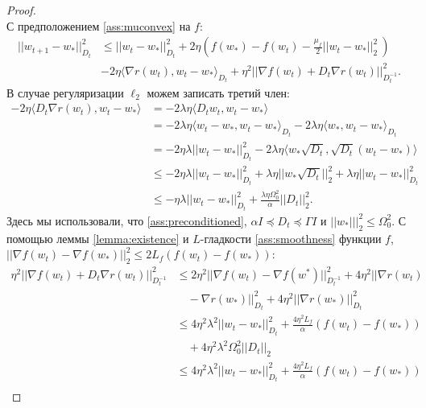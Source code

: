 \begin{proof}
\begin{equation*}
    \end{equation*}
С предположением \ref{ass:muconvex} на $f$:
\begin{equation*}
\begin{split}
    ||w_{t+1}-w_*||_{D_t}^2 &\leq ||w_t-w_*||_{D_t}^2 + 2\eta \left(f(w_*) - f(w_t) - \frac{\mu_f}{2} ||w_t - w_*||_2^2 \ \right)\\ 
    & - 2\eta \langle \nabla r(w_t), w_t - w_* \rangle_{D_t} + \eta^2 ||\nabla f(w_t) + D_t \nabla r(w_t)||_{D_t^{-1}}^2.
\end{split}
\end{equation*}
В случае регуляризации $\ell_2$ можем записать третий член:
\begin{equation*}
\begin{split}
    -2\eta \langle D_t \nabla r(w_t), w_t-w_*\rangle &= -2\lambda\eta \langle D_t w_t, w_t-w_*\rangle \\
    &= -2\lambda\eta \langle w_t - w_*, w_t-w_*\rangle_{D_t} - 2\lambda\eta \langle w_*, w_t-w_*\rangle_{D_t}\\
    &= -2\eta\lambda||w_t-w_*||_{D_t}^2 - 2\lambda\eta\langle w_*\sqrt{D_t}, \sqrt{D_t}(w_t-w_*)\rangle \\
    &\leq -2\eta \lambda ||w_t-w_*||_{D_t}^2 + \lambda\eta||w_*\sqrt{D_t}||_2^2 + \lambda\eta||w_t - w_*||_{D_t}^2 \\
    &\leq -\eta\lambda||w_t-w_*||_{D_t}^2 + \frac{\lambda\eta\Omega_0^2}{\alpha}||D_t||_2^2.
    \end{split}
\end{equation*}
Здесь мы использовали, что \ref{ass:preconditioned}, $\alpha I \preccurlyeq D_t \preccurlyeq \Gamma I$ и $||w_*|||_2^2 \leq \Omega_0^2$. С помощью леммы \ref{lemma:existence} и $L$-гладкости \ref{ass:smoothness} функции $f$, $||\nabla f(w_t) - \nabla f(w_*)||_2^2 \leq 2L_f(f(w_t) - f(w_*))$:
\begin{equation*}
\begin{split}
    \eta^2 ||\nabla f(w_t) + D_t \nabla r(w_t)||_{D_t^{-1}}^2 &\leq 2\eta^2 ||\nabla f(w_t) - \nabla f(w^*) ||_{D_t^{-1}}^2 + 4\eta^2 ||\nabla r(w_t) \\
    & \quad  - \nabla r(w_*) ||_{D_t}^2 + 4\eta^2||\nabla r(w_*)||_{D_t}^2 \\
    &\leq 4\eta^2\lambda^2 ||w_t - w_*||_{D_t}^2 + \frac{4\eta^2L_f}{\alpha} \left(f(w_t)-f(w_*)\right) \\
    & \quad + 4\eta^2\lambda^2\Omega_0^2||D_t||_2 \\
    & \leq 4\eta^2\lambda^2 ||w_t - w_*||_{D_t}^2 + \frac{4\eta^2L_f}{\alpha} \left(f(w_t)-f(w_*)\right) \\

\end{split}
\end{equation*}
\end{proof}

